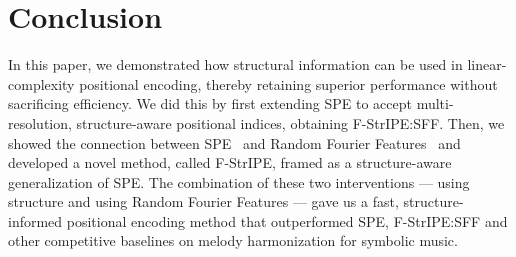 \section{Conclusion}

In this paper, we demonstrated how structural information can be used in linear-complexity positional encoding, thereby retaining superior performance without sacrificing efficiency. We did this by first extending SPE to accept multi-resolution, structure-aware positional indices, obtaining F-StrIPE:SFF. Then, we showed the connection between SPE~\cite{liutkus_relative_2021} and Random Fourier Features~\cite{rahimi_random_2007} and developed a novel method, called F-StrIPE, framed as a structure-aware generalization of SPE. The combination of these two interventions --- using structure and using Random Fourier Features --- gave us a fast, structure-informed positional encoding method that outperformed SPE, F-StrIPE:SFF and other competitive baselines on melody harmonization for symbolic music.



